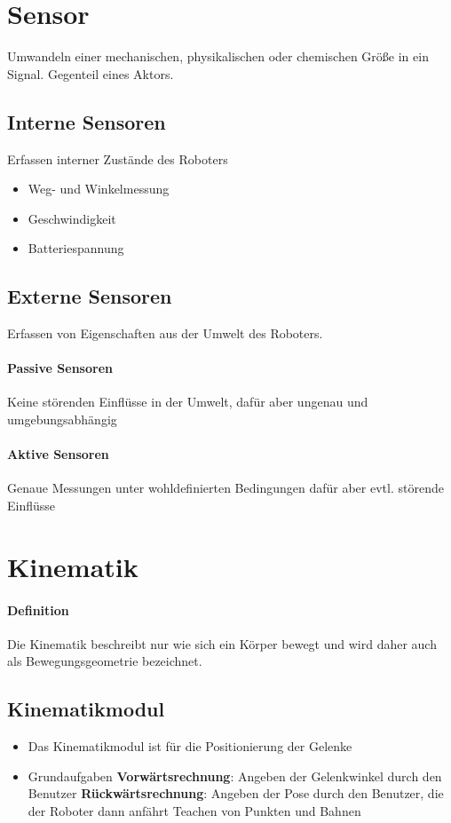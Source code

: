 \section{Sensor}
Umwandeln einer mechanischen, physikalischen oder chemischen Größe in ein Signal.
Gegenteil eines Aktors.
\subsection{Interne Sensoren} Erfassen interner Zustände des Roboters
\begin{itemize}
	\item Weg- und Winkelmessung
	\item Geschwindigkeit
	\item Batteriespannung
\end{itemize}

\subsection{Externe Sensoren}
Erfassen von Eigenschaften aus der Umwelt des Roboters.

\paragraph{Passive Sensoren}
Keine störenden Einflüsse in der Umwelt, dafür aber ungenau und
umgebungsabhängig

\paragraph{Aktive Sensoren}
Genaue Messungen unter wohldefinierten Bedingungen dafür aber evtl. störende
Einflüsse

\section{Kinematik}
\paragraph{Definition}
Die Kinematik beschreibt nur wie sich ein Körper bewegt und wird daher auch als Bewegungsgeometrie bezeichnet.

\subsection{Kinematikmodul}
\begin{itemize}
	\item Das Kinematikmodul ist für die Positionierung der Gelenke
	\item Grundaufgaben
	\subitem \textbf{Vorwärtsrechnung}: Angeben der Gelenkwinkel durch den Benutzer
	\subitem \textbf{Rückwärtsrechnung}: Angeben der Pose durch den Benutzer, die der Roboter dann anfährt
	\subitem Teachen von Punkten und Bahnen
\end{itemize}
